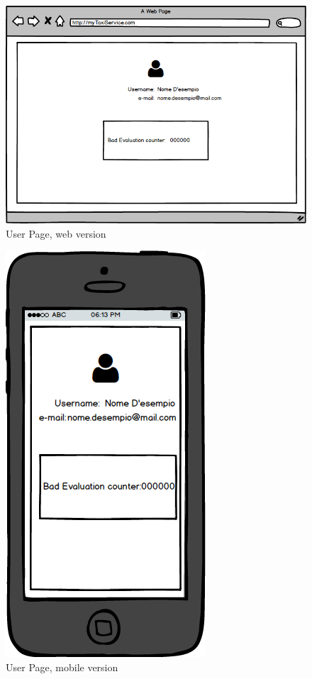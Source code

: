 \documentclass{report}
\begin{document}
				\begin{figure}[H]
					\centering
					\includegraphics[scale=0.5]{IMG/UserInterfaces/userPage.png}
					\caption{User Page, web version}\label{visina8}
				\end{figure}
				\begin{figure}[H]
					\centering
					\includegraphics[scale=0.4]{IMG/UserInterfaces/userPage_m.png}
					\caption{User Page, mobile version}\label{visina8}
				\end{figure}
\end{document}
